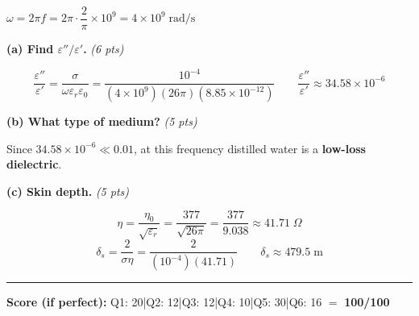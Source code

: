 \documentclass[11pt,letterpaper]{article}
\begin{document}
\begin{notebox}
$\omega = 2\pi f = 2\pi\cdot\dfrac{2}{\pi}\times10^9 = 4\times10^9\;\text{rad/s}$
\end{notebox}

\textbf{(a) Find $\varepsilon''/\varepsilon'$.} \hfill\textit{(6 pts)}

\[
\frac{\varepsilon''}{\varepsilon'}
=\frac{\sigma}{\omega\varepsilon_r\varepsilon_0}
=\frac{10^{-4}}{(4\times10^9)(26\pi)(8.85\times10^{-12})}
\qquad
\boxed{\frac{\varepsilon''}{\varepsilon'}\approx34.58\times10^{-6}}
\]

\textbf{(b) What type of medium?} \hfill\textit{(5 pts)}

Since $34.58\times10^{-6}\ll0.01$, at this frequency distilled water is a \textbf{low-loss dielectric}.

\textbf{(c) Skin depth.} \hfill\textit{(5 pts)}

\[
\eta=\frac{\eta_0}{\sqrt{\varepsilon_r}}=\frac{377}{\sqrt{26\pi}}=\frac{377}{9.038}\approx41.71\;\Omega
\]
\[
\delta_s=\frac{2}{\sigma\eta}=\frac{2}{(10^{-4})(41.71)}
\qquad
\boxed{\delta_s\approx479.5\;\text{m}}
\]

\vspace{16pt}
\hrule
\vspace{6pt}
\begin{center}
{\small\textbf{Score (if perfect):}
Q1: 20\;|\;Q2: 12\;|\;Q3: 12\;|\;Q4: 10\;|\;Q5: 30\;|\;Q6: 16 $=$ \textbf{100/100}}
\end{center}
\end{document}
